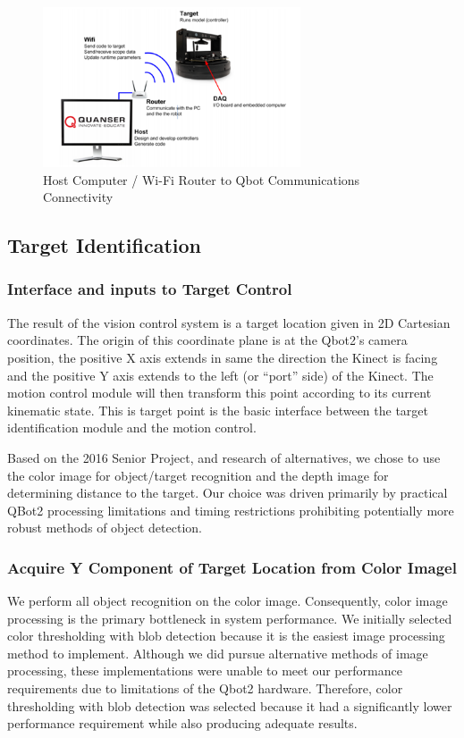 \documentclass[conference]{IEEEtran}
\begin{document}
\begin{figure}[htbp]
\begin{center}
\includegraphics[width=3in]{3}
\caption{Host Computer / Wi-Fi Router to Qbot Communications Connectivity} \label{fig:3}
\end{center}
\end{figure}

\subsection{Target Identification}
\subsubsection{Interface and inputs to Target Control}
The result of the vision control system is a target location given in 2D Cartesian coordinates. The origin of this coordinate plane is at the Qbot2’s camera position, the positive X axis extends in same the direction the Kinect is facing and the positive Y axis extends to the left (or “port” side) of the Kinect.  The motion control module will then transform this point according to its current kinematic state.   This is target point is the basic interface between the target identification module and the motion control.

Based on the 2016 Senior Project, and research of alternatives, we chose to use the color image for object/target recognition and the depth image for determining distance to the target. Our choice was driven primarily by practical QBot2 processing limitations and timing restrictions prohibiting potentially more robust methods of object detection.

\subsubsection{Acquire Y Component of Target Location from Color Imagel}
We perform all object recognition on the color image.  Consequently, color image processing is the primary bottleneck in system performance.  We initially selected color thresholding with blob detection because it is the easiest image processing method to implement.  Although we did pursue alternative methods of image processing, these implementations were unable to meet our performance requirements due to limitations of the Qbot2 hardware.  Therefore, color thresholding with blob detection was selected because it had a significantly lower performance requirement while also producing adequate results. 
\end{document}
